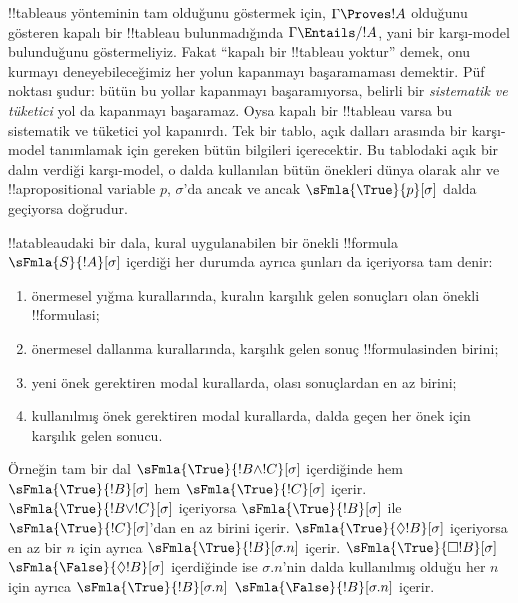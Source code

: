 \documentclass[../../../include/open-logic-section]{subfiles}
\begin{document}


\begin{explain}
  !!{tableau}s yönteminin tam olduğunu göstermek için, $\Gamma \Proves !A$
  olduğunu gösteren kapalı bir !!{tableau} bulunmadığında
  $\Gamma \Entails/ !A$, yani bir karşı-model bulunduğunu göstermeliyiz.
  Fakat ``kapalı bir !!{tableau} yoktur'' demek, onu kurmayı deneyebileceğimiz
  her yolun kapanmayı başaramaması demektir. Püf noktası şudur: bütün bu yollar
  kapanmayı başaramıyorsa, belirli bir \emph{sistematik ve tüketici} yol da
  kapanmayı başaramaz. Oysa kapalı bir !!{tableau} varsa bu sistematik ve
  tüketici yol kapanırdı. Tek bir tablo, açık dalları arasında bir karşı-model
  tanımlamak için gereken bütün bilgileri içerecektir. Bu tablodaki açık bir
  dalın verdiği karşı-model, o dalda kullanılan bütün önekleri dünya olarak
  alır ve !!a{propositional variable} $p$, $\sigma$'da ancak ve ancak
  $\sFmla{\True}{p}[\sigma]$ dalda geçiyorsa doğrudur.
\end{explain}

\begin{defn}
  !!a{tableau}{}daki bir dala, kural uygulanabilen bir önekli !!{formula}
  $\sFmla{S}{!A}[\sigma]$ içerdiği her durumda ayrıca şunları da içeriyorsa
  tam denir:
  \begin{enumerate}
    \item önermesel yığma kurallarında, kuralın karşılık gelen sonuçları olan
      önekli !!{formula}s{}i;
    \item önermesel dallanma kurallarında, karşılık gelen sonuç
      !!{formula}s{}inden birini;
    \item yeni önek gerektiren modal kurallarda, olası sonuçlardan en az birini;
    \item kullanılmış önek gerektiren modal kurallarda, dalda geçen her önek
      için karşılık gelen sonucu.
  \end{enumerate}
\end{defn}

\begin{explain}
Örneğin tam bir dal $\sFmla{\True}{!B \land !C}[\sigma]$ içerdiğinde hem
$\sFmla{\True}{!B}[\sigma]$ hem $\sFmla{\True}{!C}[\sigma]$ içerir.
$\sFmla{\True}{!B \lor !C}[\sigma]$ içeriyorsa
$\sFmla{\True}{!B}[\sigma]$ ile $\sFmla{\True}{!C}[\sigma]$'dan en az birini
içerir. 
{$\sFmla{\True}{\Diamond !B}[\sigma]$} içeriyorsa en az bir $n$ için ayrıca
{$\sFmla{\True}{!B}[\sigma.n]$} içerir. 
{$\sFmla{\True}{\Box !B}[\sigma]$}
{$\sFmla{\False}{\Diamond !B}[\sigma]$} içerdiğinde ise $\sigma.n$'nin dalda
kullanılmış olduğu her $n$ için ayrıca 
{$\sFmla{\True}{!B}[\sigma.n]$}
{$\sFmla{\False}{!B}[\sigma.n]$} içerir.
\end{explain}
\end{document}
